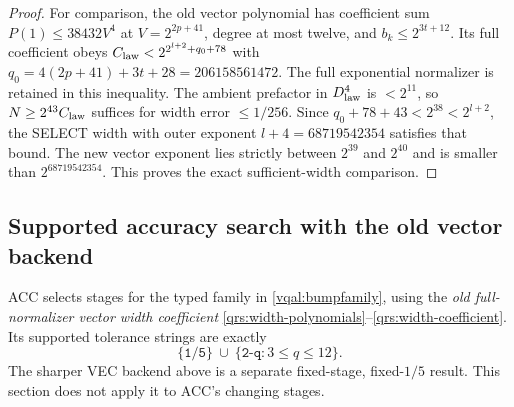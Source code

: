 \documentclass[11pt]{article}
\theoremstyle{plain}
\theoremstyle{definition}
\theoremstyle{remark}
\begin{document}
\begin{proof}
For comparison, the old vector polynomial has coefficient sum
$P(1)\le38432V^4$ at $V=2^{2p+41}$, degree at most twelve, and
$b_k\le2^{3t+12}$. Its full coefficient obeys
$C_{\rm law}<2^{2^{l+2}+q_0+78}$ with
$q_0=4(2p+41)+3t+28=206158561472$.
The full exponential normalizer is retained in this inequality.
The ambient prefactor in $D_{\rm law}^4$ is $<2^{11}$, so
$N\ge2^{43}C_{\rm law}$ suffices for width error $\le1/256$.
Since $q_0+78+43<2^{38}<2^{l+2}$, the SELECT width with outer exponent
$l+4=68719542354$ satisfies that bound. The new vector exponent lies
strictly between $2^{39}$ and $2^{40}$ and is smaller than
$2^{68719542354}$. This proves the exact sufficient-width comparison.
\end{proof}

\subsection{Supported accuracy search with the old vector backend}
\label{vqal:accuracy}

ACC selects stages for the typed family in \eqref{vqal:bumpfamily},
using the \emph{old full-normalizer vector width coefficient}
\eqref{qrs:width-polynomials}--\eqref{qrs:width-coefficient}.
Its supported tolerance strings are exactly
\begin{equation}\label{vqal:tolerances}
          \{\texttt{1/5}\}\ \cup\ \{\texttt{2\^{}-q}:3\le q\le12\}.
\end{equation}
The sharper VEC backend above is a separate fixed-stage, fixed-$1/5$
result. This section does not apply it to ACC's changing stages.
\end{document}
